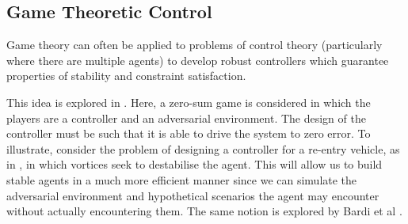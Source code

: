 \documentclass[.../main.tex]{subfiles}
\begin{document}

\subsection{Game Theoretic Control} \label{Game Theoretic Control}

Game theory can often be applied to problems of control theory
(particularly where there are multiple agents) to develop robust
controllers which guarantee properties of stability and constraint
satisfaction.

This idea is explored in \cite{Marden2018AnnualControl}. Here, a
zero-sum game is considered in which the players are a controller and
an adversarial environment. The design of the controller must be such
that it is able to drive the system to zero error. To illustrate,
consider the problem of designing a controller for a re-entry vehicle,
as in \cite{Breitner1994ReentryGame}, in which vortices seek to
destabilise the agent. This will allow us to build stable agents in a
much more efficient manner since we can simulate the adversarial
environment and hypothetical scenarios the agent may encounter without
actually encountering them. The same notion is explored by Bardi et al
\cite{Bardi1991DifferentialDisturbances}.
\end{document}
